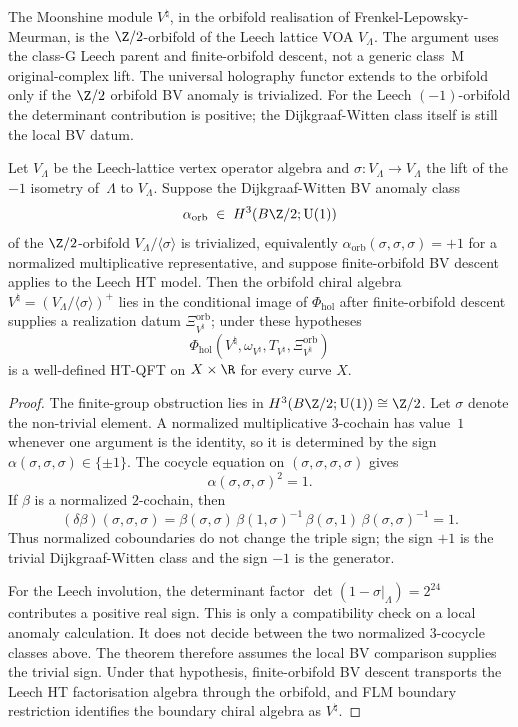 The Moonshine module $V^\natural$, in the orbifold realisation of
Frenkel-Lepowsky-Meurman, is the $\Z/2$-orbifold of the Leech
lattice VOA $V_\Lambda$. The argument uses the class-G Leech parent
and finite-orbifold descent, not a generic class~M original-complex
lift. The universal holography functor extends to the orbifold only if
the $\Z/2$ orbifold BV anomaly is trivialized. For the Leech
$(-1)$-orbifold the determinant contribution is positive; the
Dijkgraaf-Witten class itself is still the local BV datum.

\begin{theorem}
\label{thm:uhf-monster-orbifold-bv-anomaly-vanishes}
Let $V_\Lambda$ be the Leech-lattice vertex operator algebra and
$\sigma \colon V_\Lambda \to V_\Lambda$ the lift of the $-1$
isometry of~$\Lambda$ to $V_\Lambda$. Suppose the Dijkgraaf-Witten BV
anomaly class
\[
 \alpha_{\mathrm{orb}}
 \;\in\;
 H^3(B\Z/2; \mathrm{U}(1))
\]
of the $\Z/2$-orbifold $V_\Lambda / \langle \sigma \rangle$ is
trivialized, equivalently
$\alpha_{\mathrm{orb}}(\sigma,\sigma,\sigma)=+1$ for a normalized
multiplicative representative, and suppose finite-orbifold BV descent
applies to the Leech HT model. Then the orbifold chiral algebra
$V^\natural = (V_\Lambda / \langle \sigma \rangle)^+$ lies in the
conditional image of $\Phi_{\mathrm{hol}}$ after finite-orbifold
descent supplies a realization datum \(\Xi_{V^\natural}^{\mathrm{orb}}\);
under these hypotheses
\[
\Phi_{\mathrm{hol}}(V^\natural,\omega_{V^\natural},
T_{V^\natural},\Xi_{V^\natural}^{\mathrm{orb}})
\]
is a well-defined HT-QFT on $X \times \R$ for every curve $X$.
\end{theorem}

\begin{proof}
The finite-group obstruction lies in
$H^3(B\Z/2;\mathrm{U}(1))\cong\Z/2$.  Let
$\sigma$ denote the non-trivial element.  A normalized multiplicative
$3$-cochain has value~$1$ whenever one argument is the identity, so it
is determined by the sign
$\alpha(\sigma,\sigma,\sigma)\in\{\pm1\}$. The cocycle equation on
$(\sigma,\sigma,\sigma,\sigma)$ gives
\[
 \alpha(\sigma,\sigma,\sigma)^2=1.
\]
If $\beta$ is a normalized $2$-cochain, then
\[
 (\delta\beta)(\sigma,\sigma,\sigma)
 =
 \beta(\sigma,\sigma)\,
 \beta(1,\sigma)^{-1}\,
 \beta(\sigma,1)\,
 \beta(\sigma,\sigma)^{-1}
 =1.
\]
Thus normalized coboundaries do not change the triple sign; the sign
$+1$ is the trivial Dijkgraaf-Witten class and the sign $-1$ is the
generator.

For the Leech involution, the determinant factor
$\det(1-\sigma|_\Lambda)=2^{24}$ contributes a positive real sign.
This is only a compatibility check on a local anomaly calculation. It
does not decide between the two normalized $3$-cocycle classes above.
The theorem therefore assumes the local BV comparison supplies the
trivial sign. Under that hypothesis, finite-orbifold BV descent
transports the Leech HT factorisation algebra through the orbifold,
and FLM boundary restriction identifies the boundary chiral algebra as
$V^\natural$.
\end{proof}

